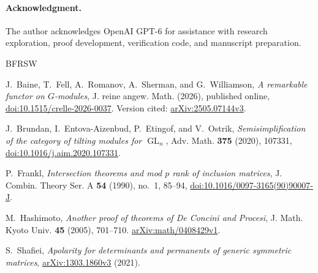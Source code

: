 \documentclass[11pt]{article}
\theoremstyle{definition}
\theoremstyle{remark}
\numberwithin{equation}{section}
\DeclareMathOperator{\GL}{GL}
\begin{document}
\paragraph{Acknowledgment.}
The author acknowledges OpenAI GPT-6 for assistance with research
exploration, proof development, verification code, and manuscript
preparation.

\begin{thebibliography}{BFRSW}

J.~Baine, T.~Fell, A.~Romanov, A.~Sherman, and G.~Williamson,
\emph{A remarkable functor on $G$-modules},
J. reine angew. Math. (2026), published online,
\href{https://doi.org/10.1515/crelle-2026-0037}{doi:10.1515/crelle-2026-0037}.
Version cited: \href{https://arxiv.org/abs/2505.07144v3}{arXiv:2505.07144v3}.

J.~Brundan, I.~Entova-Aizenbud, P.~Etingof, and V.~Ostrik,
\emph{Semisimplification of the category of tilting modules for $\GL_n$},
Adv. Math. \textbf{375} (2020), 107331,
\href{https://doi.org/10.1016/j.aim.2020.107331}{doi:10.1016/j.aim.2020.107331}.

P.~Frankl,
\emph{Intersection theorems and mod $p$ rank of inclusion matrices},
J. Combin. Theory Ser. A \textbf{54} (1990), no.~1, 85--94,
\href{https://doi.org/10.1016/0097-3165(90)90007-J}{doi:10.1016/0097-3165(90)90007-J}.

M.~Hashimoto,
\emph{Another proof of theorems of De Concini and Procesi},
J. Math. Kyoto Univ. \textbf{45} (2005), 701--710.
\href{https://arxiv.org/abs/math/0408429v1}{arXiv:math/0408429v1}.

S.~Shafiei,
\emph{Apolarity for determinants and permanents of generic symmetric matrices},
\href{https://arxiv.org/abs/1303.1860v3}{arXiv:1303.1860v3} (2021).

\end{thebibliography}
\end{document}
